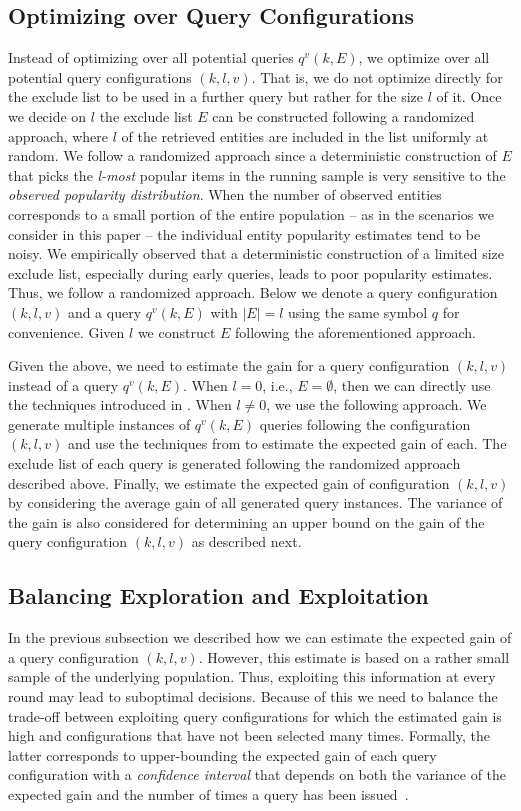 \subsection{Optimizing over Query Configurations}
\label{sec:config}
Instead of optimizing over all potential queries $q^v(k,E)$, we optimize over all potential query configurations $(k,l,v)$. That is, we do not optimize directly for the exclude list to be used in a further query but rather for the size $l$ of it. Once we decide on $l$ the exclude list $E$ can be constructed following a randomized approach, where $l$ of the retrieved entities are included in the list uniformly at random. We follow a randomized approach since a deterministic construction of $E$ that picks the {\em l-most} popular items in the running sample is very sensitive to the {\em observed popularity distribution}. When the number of observed entities corresponds to a small portion of the entire population -- as in the scenarios we consider in this paper -- the individual entity popularity estimates tend to be noisy.  We empirically observed that a deterministic construction of a limited size exclude list, especially during early queries, leads to poor popularity estimates. Thus, we follow a randomized approach. Below we denote a query configuration $(k,l,v)$ and a query $q^v(k,E)$ with $|E| = l$ using the same symbol $q$ for convenience. Given $l$ we construct $E$ following the aforementioned approach.

Given the above, we need to estimate the gain for a query configuration $(k,l,v)$ instead of a query $q^v(k,E)$. When $l = 0$, i.e., $E = \emptyset$, then we can directly use the techniques introduced in . When $l \neq 0$, we use the following approach. We generate multiple instances of $q^v(k,E)$ queries following the configuration $(k,l,v)$ and use the techniques from  to estimate the expected gain of each. The exclude list of each query is generated following the randomized approach described above. Finally, we estimate the expected gain of configuration $(k,l,v)$ by considering the average gain of all generated query instances. The variance of the gain is also considered for determining an upper bound on the gain of the query configuration $(k,l,v)$ as described next.

\subsection{Balancing Exploration and Exploitation}
\label{sec:balancing}
In the previous subsection we described how we can estimate the expected gain of a query configuration $(k,l,v)$. However, this estimate is based on a rather small sample of the underlying population. Thus, exploiting this information at every round may lead to suboptimal decisions. Because of this we need to balance the trade-off between exploiting query configurations for which the estimated gain is high and configurations that have not been selected many times. Formally, the latter corresponds to upper-bounding the expected gain of each query configuration with a {\em confidence interval} that depends on both the variance of the expected gain and the number of times a query has been issued~\cite{Auer:2003}.

